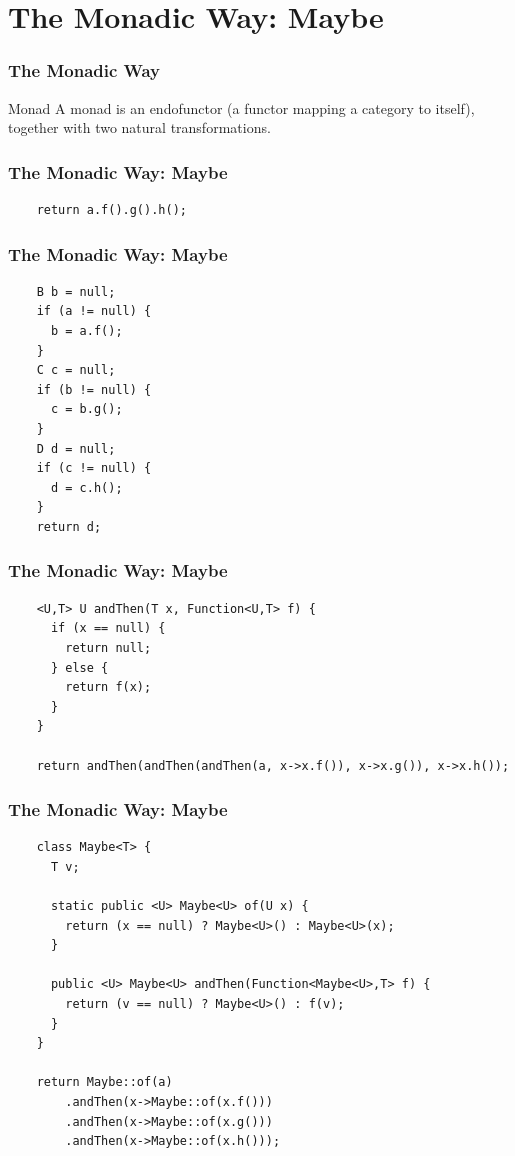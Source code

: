 \documentclass[lualatex]{beamer}
\begin{document}
\section{The Monadic Way: Maybe}

\begin{frame}
  \frametitle{The Monadic Way}

  \begin{block}{Monad}
    A monad is an endofunctor (a functor mapping a category to itself), together with two natural transformations.
  \end{block}
\end{frame}

\begin{frame}[fragile]
  \frametitle{The Monadic Way: Maybe}
  \begin{verbatim}
    return a.f().g().h();
  \end{verbatim}
\end{frame}

\begin{frame}[fragile]
  \frametitle{The Monadic Way: Maybe}
  \begin{verbatim}
    B b = null;
    if (a != null) {
      b = a.f();
    }
    C c = null;
    if (b != null) {
      c = b.g();
    }
    D d = null;
    if (c != null) {
      d = c.h();
    }
    return d;
  \end{verbatim}
\end{frame}

\begin{frame}[fragile]
  \frametitle{The Monadic Way: Maybe}
  \begin{verbatim}
    <U,T> U andThen(T x, Function<U,T> f) {
      if (x == null) {
        return null;
      } else {
        return f(x);
      }
    }

    return andThen(andThen(andThen(a, x->x.f()), x->x.g()), x->x.h());
  \end{verbatim}
\end{frame}

\begin{frame}[fragile]
  \frametitle{The Monadic Way: Maybe}
  \begin{verbatim}
    class Maybe<T> {
      T v;

      static public <U> Maybe<U> of(U x) {
        return (x == null) ? Maybe<U>() : Maybe<U>(x);
      }

      public <U> Maybe<U> andThen(Function<Maybe<U>,T> f) {
        return (v == null) ? Maybe<U>() : f(v);
      }
    }

    return Maybe::of(a)
        .andThen(x->Maybe::of(x.f()))
        .andThen(x->Maybe::of(x.g()))
        .andThen(x->Maybe::of(x.h()));
  \end{verbatim}
\end{frame}
\end{document}
